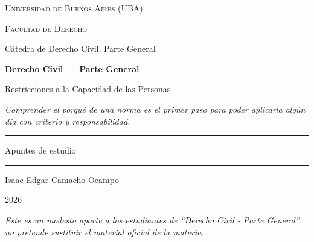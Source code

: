 \documentclass[12pt,oneside]{book}
\newcommand{\universidad}{Universidad de Buenos Aires (UBA)}
\newcommand{\facultad}{Facultad de Derecho}
\newcommand{\materia}{Derecho Civil --- Parte General}
\newcommand{\titulo}{Restricciones a la Capacidad de las Personas}
\newcommand{\autor}{Isaac Edgar Camacho Ocampo}
\newcommand{\anio}{2026}
\begin{document}
\begin{titlepage}

\thispagestyle{empty}

\begin{center}

\vspace*{1cm}

{\large \textsc{\universidad}}

\vspace{0.2cm}

{\large \textsc{\facultad}}

\vspace{0.2cm}

{\large Cátedra de Derecho Civil, Parte General}

\vspace{3cm}

{\Huge \textbf{\materia}}

\vspace{1cm}

{\LARGE \titulo}

\vspace{0.8cm}

\textit{Comprender el porqué de una norma es el primer paso para poder aplicarla algún día con criterio y responsabilidad.}

\vspace{1.2cm}

\rule{0.70\textwidth}{0.5pt}

\vspace{0.5cm}

{\large Apuntes de estudio}

\vspace{0.5cm}

\rule{0.70\textwidth}{0.5pt}

\vfill

{\large \autor}

\vspace{0.3cm}

{\large \anio}

\end{center}

\vfill

\begin{flushleft}
\textit{Este es un modesto aporte a los estudiantes de ``Derecho Civil - Parte General'' no pretende sustituir el material oficial de la materia.}
\end{flushleft}

\end{titlepage}
\end{document}
